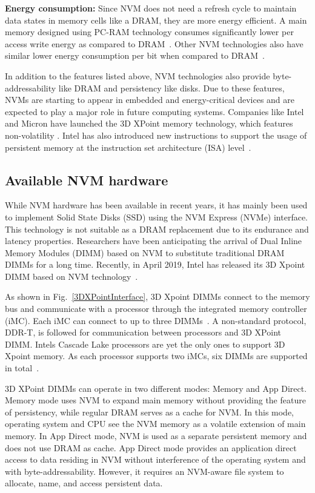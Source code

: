 \noindent\textbf{Energy consumption:} Since NVM does not need a refresh cycle to maintain data states in memory cells like a  DRAM, 
they are more energy efficient. A main memory designed using PC-RAM technology consumes significantly lower per access write energy as compared to DRAM~\cite{zhou2009durable}. Other NVM technologies also have similar lower energy consumption per bit when compared to DRAM~\cite{arulraj2015let,perez2010non}.

In addition to the features listed above, NVM technologies also provide byte-addressability like DRAM and persistency like disks. Due to these features, NVMs are starting to appear in embedded and energy-critical devices and are expected to play a major role in future computing systems. Companies like Intel and Micron have launched the 3D XPoint memory technology, which features non-volatility \cite{3DXPoint}. Intel has also introduced new instructions to support the usage of persistent memory at the instruction set architecture (ISA) level~\cite{intel2016architecture}.

\subsection{Available NVM hardware}\label{NVDIMM}

While NVM hardware has been available in recent years, it has mainly been used to implement Solid State Disks (SSD) using the NVM Express (NVMe) interface. This technology is not suitable as a DRAM replacement due to its endurance and latency properties. Researchers have been anticipating the arrival of Dual Inline Memory Modules (DIMM) based on NVM to substitute traditional DRAM DIMMs for a long time. Recently, in April 2019, Intel has released its 3D Xpoint DIMM based on NVM technology~\cite{hirofuchi2019preliminary}.

As shown in Fig.~\ref{3DXPointInterface}, 3D Xpoint DIMMs connect to the memory bus and communicate with a processor through the integrated memory controller (iMC). Each iMC can connect to up to three DIMMs~\cite{peng2019system,yang2019empirical}. A non-standard protocol, DDR-T, is followed for communication between processors and 3D XPoint DIMM. Intel\textquotesingle s Cascade Lake processors are yet the only ones to support 3D Xpoint memory.  As each processor supports two iMCs, six DIMMs are supported in total~\cite{peng2019system,yang2019empirical,izraelevitz2019basic}.

3D XPoint DIMMs can operate in two different modes: Memory and App Direct. Memory mode uses NVM to expand main memory without providing the feature of persistency, while regular DRAM serves as a cache for NVM. In this mode, operating system and CPU see the NVM memory as a volatile extension of main memory. In App Direct mode, NVM is used as a separate persistent memory and does not use DRAM as cache. App Direct mode provides an application direct access to data residing in NVM without interference of the operating system and with byte-addressability. However, it requires an NVM-aware file system to allocate, name, and access persistent data.

